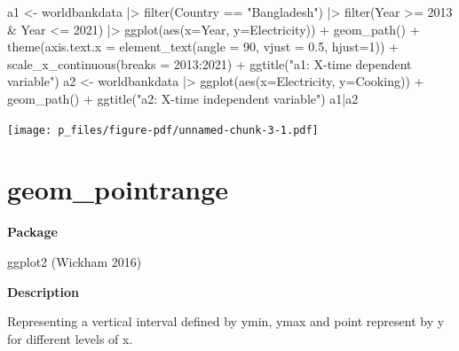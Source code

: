 \documentclass[
  letterpaper,
  DIV=11,
  numbers=noendperiod]{scrreprt}
\newenvironment{Shaded}{\begin{snugshade}}{\end{snugshade}}
\newcommand{\AttributeTok}[1]{\textcolor[rgb]{0.40,0.45,0.13}{#1}}
\newcommand{\DecValTok}[1]{\textcolor[rgb]{0.68,0.00,0.00}{#1}}
\newcommand{\FloatTok}[1]{\textcolor[rgb]{0.68,0.00,0.00}{#1}}
\newcommand{\FunctionTok}[1]{\textcolor[rgb]{0.28,0.35,0.67}{#1}}
\newcommand{\NormalTok}[1]{\textcolor[rgb]{0.00,0.23,0.31}{#1}}
\newcommand{\OtherTok}[1]{\textcolor[rgb]{0.00,0.23,0.31}{#1}}
\newcommand{\SpecialCharTok}[1]{\textcolor[rgb]{0.37,0.37,0.37}{#1}}
\newcommand{\StringTok}[1]{\textcolor[rgb]{0.13,0.47,0.30}{#1}}
\begin{document}
\begin{Shaded}
\begin{Highlighting}[]
\NormalTok{a1 }\OtherTok{\textless{}{-}}\NormalTok{ worldbankdata }\SpecialCharTok{|\textgreater{}}
  \FunctionTok{filter}\NormalTok{(Country }\SpecialCharTok{==} \StringTok{"Bangladesh"}\NormalTok{) }\SpecialCharTok{|\textgreater{}} 
  \FunctionTok{filter}\NormalTok{(Year }\SpecialCharTok{\textgreater{}=} \DecValTok{2013} \SpecialCharTok{\&}\NormalTok{ Year }\SpecialCharTok{\textless{}=} \DecValTok{2021}\NormalTok{) }\SpecialCharTok{|\textgreater{}}
  \FunctionTok{ggplot}\NormalTok{(}\FunctionTok{aes}\NormalTok{(}\AttributeTok{x=}\NormalTok{Year, }\AttributeTok{y=}\NormalTok{Electricity)) }\SpecialCharTok{+} 
  \FunctionTok{geom\_path}\NormalTok{() }\SpecialCharTok{+}
  \FunctionTok{theme}\NormalTok{(}\AttributeTok{axis.text.x =} \FunctionTok{element\_text}\NormalTok{(}\AttributeTok{angle =} \DecValTok{90}\NormalTok{, }\AttributeTok{vjust =} \FloatTok{0.5}\NormalTok{, }\AttributeTok{hjust=}\DecValTok{1}\NormalTok{)) }\SpecialCharTok{+} 
  \FunctionTok{scale\_x\_continuous}\NormalTok{(}\AttributeTok{breaks =} \DecValTok{2013}\SpecialCharTok{:}\DecValTok{2021}\NormalTok{)  }\SpecialCharTok{+} 
  \FunctionTok{ggtitle}\NormalTok{(}\StringTok{"a1: X{-}time dependent variable"}\NormalTok{)}
\NormalTok{a2 }\OtherTok{\textless{}{-}}\NormalTok{ worldbankdata }\SpecialCharTok{|\textgreater{}}
  \FunctionTok{ggplot}\NormalTok{(}\FunctionTok{aes}\NormalTok{(}\AttributeTok{x=}\NormalTok{Electricity, }\AttributeTok{y=}\NormalTok{Cooking)) }\SpecialCharTok{+} 
  \FunctionTok{geom\_path}\NormalTok{() }\SpecialCharTok{+} \FunctionTok{ggtitle}\NormalTok{(}\StringTok{"a2: X{-}time independent variable"}\NormalTok{)}
\NormalTok{a1}\SpecialCharTok{|}\NormalTok{a2}
\end{Highlighting}
\end{Shaded}

\texttt{[image: p\_files/figure-pdf/unnamed-chunk-3-1.pdf]}

\section{geom\_pointrange}\label{geom_pointrange}

\textbf{Package}

ggplot2 (Wickham 2016)

\textbf{Description}

Representing a vertical interval defined by ymin, ymax and point
represent by y for different levels of x.
\end{document}
